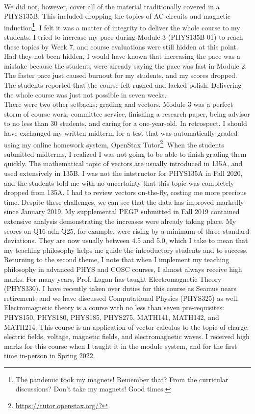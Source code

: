 \documentclass[../../../main.tex]{subfiles}
\begin{document}
\\
\vspace{0.25cm}
We did not, however, cover all of the material traditionally covered in a PHYS135B.  This included dropping the topics of AC circuits and magnetic induction\footnote{The pandemic took my magnets!  Remember that?  From the curricular discussions?  Don't take my magnets!  Good times.}.  I felt it was a matter of integrity to deliver the whole course to my students. I tried to increase my pace during Module 3 (PHYS135B-01) to reach these topics by Week 7, and course evaluations were still hidden at this point.  Had they not been hidden, I would have known that increasing the pace was a mistake because the students were already saying the pace was fast in Module 2.  The faster pace just caused burnout for my students, and my scores dropped.  The students reported that the course felt rushed and lacked polish.  Delivering the whole course was just not possible in seven weeks.
\\
\vspace{0.25cm}
There were two other setbacks: grading and vectors.  Module 3 was a perfect storm of course work, committee service, finishing a research paper, being advisor to no less than 30 students, and caring for a one-year-old. In retrospect, I should have exchanged my written midterm for a test that was automatically graded using my online homework system, OpenStax Tutor\footnote{\url{https://tutor.openstax.org/?}}.  When the students submitted midterms, I realized I was not going to be able to finish grading them quickly.  The mathematical topic of vectors are usually introduced in 135A, and used extensively in 135B.  I was not the intstructor for PHYS135A in Fall 2020, and the students told me with no uncertainty that this topic was completely dropped from 135A.  I had to review vectors on-the-fly, costing me more precious time.  Despite these challenges, we can see that the data has improved markedly since January 2019.  My supplemental PEGP submitted in Fall 2019 contained extensive analysis demonstrating the increases were already taking place.  My scores on Q16 adn Q25, for example, were rising by a minimum of three standard deviations.  They are now usually between 4.5 and 5.0, which I take to mean that my teaching philosophy helps me guide the introductory students and to success.
\\
\vspace{0.25cm}
Returning to the second theme, I note that when I implement my teaching philosophy in advanced PHYS and COSC courses, I almost always receive high marks.  For many years, Prof. Lagan has taught Electromagnetic Theory (PHYS330).  I have recently taken over duties for this course as Seamus nears retirement, and we have discussed Computational Physics (PHYS325) as well.  Electromagnetic theory is a course with no less than seven pre-requisites: PHYS150, PHYS180, PHYS185, PHYS275, MATH141, MATH142, and MATH214.  This course is an application of vector calculus to the topic of charge, electric fields, voltage, magnetic fields, and electromagnetic waves.  I received high marks for this course when I taught it in the module system, and for the first time in-person in Spring 2022.
\end{document}
